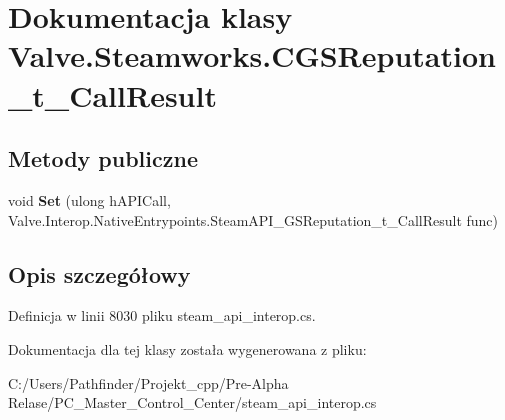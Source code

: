 \hypertarget{class_valve_1_1_steamworks_1_1_c_g_s_reputation__t___call_result}{}\section{Dokumentacja klasy Valve.\+Steamworks.\+C\+G\+S\+Reputation\+\_\+t\+\_\+\+Call\+Result}
\label{class_valve_1_1_steamworks_1_1_c_g_s_reputation__t___call_result}
\subsection*{Metody publiczne}
\begin{DoxyCompactItemize}
\item 
\mbox{\label{class_valve_1_1_steamworks_1_1_c_g_s_reputation__t___call_result_ace8682082de35c75181df4d461428ab7}} 
void {\bfseries Set} (ulong h\+A\+P\+I\+Call, Valve.\+Interop.\+Native\+Entrypoints.\+Steam\+A\+P\+I\+\_\+\+G\+S\+Reputation\+\_\+t\+\_\+\+Call\+Result func)
\end{DoxyCompactItemize}


\subsection{Opis szczegółowy}


Definicja w linii 8030 pliku steam\+\_\+api\+\_\+interop.\+cs.



Dokumentacja dla tej klasy została wygenerowana z pliku\+:\begin{DoxyCompactItemize}
\item 
C\+:/\+Users/\+Pathfinder/\+Projekt\+\_\+cpp/\+Pre-\/\+Alpha Relase/\+P\+C\+\_\+\+Master\+\_\+\+Control\+\_\+\+Center/steam\+\_\+api\+\_\+interop.\+cs\end{DoxyCompactItemize}
